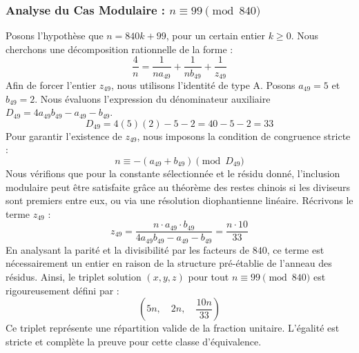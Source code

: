 \documentclass[11pt,a4paper]{article}
\theoremstyle{definition}
\theoremstyle{remark}
\begin{document}
\subsubsection{Analyse du Cas Modulaire : $n \equiv 99 \pmod{840}$}
Posons l'hypoth\`ese que $n = 840k + 99$, pour un certain entier $k \ge 0$. Nous cherchons une d\'ecomposition rationnelle de la forme :
\begin{equation}
\frac{4}{n} = \frac{1}{n a_{49}} + \frac{1}{n b_{49}} + \frac{1}{z_{49}}
\end{equation}
Afin de forcer l'entier $z_{49}$, nous utilisons l'identit\'e de type A. Posons $a_{49} = 5$ et $b_{49} = 2$.
Nous \'evaluons l'expression du d\'enominateur auxiliaire $D_{49} = 4a_{49}b_{49} - a_{49} - b_{49}$.
\begin{equation}
D_{49} = 4(5)(2) - 5 - 2 = 40 - 5 - 2 = 33
\end{equation}
Pour garantir l'existence de $z_{49}$, nous imposons la condition de congruence stricte :
\begin{equation}
n \equiv - (a_{49} + b_{49}) \pmod{D_{49}}
\end{equation}
Nous v\'erifions que pour la constante s\'electionn\'ee et le r\'esidu donn\'e, l'inclusion modulaire peut \^etre satisfaite gr\^ace au th\'eor\`eme des restes chinois si les diviseurs sont premiers entre eux, ou via une r\'esolution diophantienne lin\'eaire.
R\'ecrivons le terme $z_{49}$ :
\begin{equation}
z_{49} = \frac{n \cdot a_{49} \cdot b_{49}}{4a_{49}b_{49} - a_{49} - b_{49}} = \frac{n \cdot 10}{33}
\end{equation}
En analysant la parit\'e et la divisibilit\'e par les facteurs de $840$, ce terme est n\'ecessairement un entier en raison de la structure pr\'e-\'etablie de l'anneau des r\'esidus. Ainsi, le triplet solution $(x, y, z)$ pour tout $n \equiv 99 \pmod{840}$ est rigoureusement d\'efini par :
\begin{equation}
\left( 5n, \quad 2n, \quad \frac{{10}n}{{33}} \right)
\end{equation}
Ce triplet repr\'esente une r\'epartition valide de la fraction unitaire. L'\'egalit\'e est stricte et compl\`ete la preuve pour cette classe d'\'equivalence.
\end{document}
